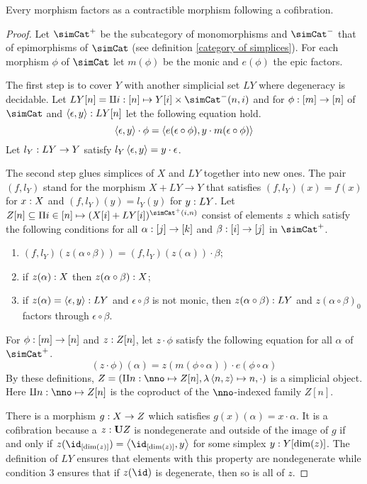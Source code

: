 \documentclass[csh.tex]{subfiles}
\begin{document}
\begin{proposition} Every morphism factors as a contractible morphism following a cofibration. \label{factor1} \end{proposition}

\begin{proof}  
Let $\simCat^+$ be the subcategory of monomorphisms and $\simCat^-$ that of epimorphisms of $\simCat$ (see definition \ref{category of simplices}). For each morphism $\phi$ of $\simCat$ let $m(\phi)$ be the monic and $e(\phi)$ the epic factors.

The first step is to cover $Y$ with another simplicial set $LY$ where degeneracy is decidable.
Let $LY[n] = \coproduct{i\of[n]}{Y[i]\times\simCat^-(n,i)}$ and for $\phi: [m]\to [n]$ of $\simCat$ and $\left\langle \epsilon,y \right\rangle: LY[n]$ let the following equation hold.
\[\left\langle \epsilon,y \right\rangle\cdot \phi=\left\langle e(\epsilon\circ \phi),y\cdot m(\epsilon\circ\phi) \right\rangle\]
Let $l_Y: LY\to Y$ satisfy $l_Y\left\langle \epsilon,y \right\rangle=y\cdot\epsilon$.

The second step glues simplices of $X$ and $LY$ together into new ones.
The pair $(f,l_Y)$ stand for the morphism $X+LY\to Y$ that satisfies $(f,l_Y)(x)=f(x)$ for $x: X$ and $(f,l_Y)(y) = l_Y(y)$ for $y: LY$. Let $Z[n]\subseteq \product{i\in[n]}{(X[i]+LY[i])^{\simCat^+(i,n)}}$ consist of elements $z$ which satisfy the following conditions for all $\alpha: [j]\to [k]$ and $\beta: [i]\to[j]$ in $\simCat^+$.
\begin{enumerate}
\item $(f,l_Y)(z(\alpha\circ\beta)) = (f,l_Y)(z(\alpha))\cdot\beta$;
\item if $z(\alpha): X$ then $z(\alpha\circ\beta): X$;
\item if $z(\alpha)=\left\langle \epsilon,y \right\rangle: LY$ and $\epsilon\circ\beta$ is not monic, then $z(\alpha\circ\beta): LY$ and $z(\alpha\circ\beta)_0$ factors through $\epsilon\circ\beta$.
\end{enumerate}
For $\phi:[m]\to [n]$ and $z: Z[n]$, let $z\cdot\phi$ satisfy the following equation for all $\alpha$ of $\simCat^+$.
\[ (z\cdot\phi)(\alpha) = z(m(\phi\circ\alpha))\cdot e(\phi\circ \alpha) \]
By these definitions, $Z=(\coproduct{n\of\nno}{Z[n]},\function{\tuplet{n,z}}n,\cdot)$ is a simplicial object. Here $\coproduct{n\of\nno}{Z[n]}$ is the coproduct of the $\nno$-indexed family $Z[n]$.

There is a morphism $g: X\to Z$ which satisfies $g(x)(\alpha) = x\cdot\alpha$. It is a cofibration because a $z:\mathbf{U} Z$ is nondegenerate and outside of the image of $g$ if and only if $z(\id_{[\dim(z)]}) = \tuplet{\id_{[\dim(z)]},y}$ for some simplex $y: Y[\dim(z)]$. The definition of $LY$ ensures that elements with this property are nondegenerate while condition 3 ensures that if $z(\id)$ is degenerate, then so is all of $z$.


\end{proof}
\end{document}
